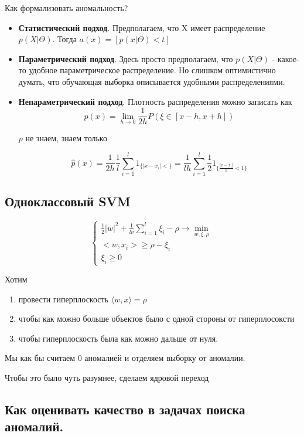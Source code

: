 \documentclass[12pt]{article}
\begin{document}
Как формализовать аномальность?
\begin{itemize}
    \item \textbf{Статистический подход}.
    Предполагаем, что X имеет распределение $p(X|\Theta)$. Тогда $a(x) = [p(x|\Theta) < t]$
    \item \textbf{Параметрический подход}. Здесь просто предполагаем, что $p(X|\Theta)$ - какое-то удобное параметрическое распределение. Но слишком оптимистично думать, что обучающая выборка описывается удобными распределениями.
    \item \textbf{Непараметрический подход}. Плотность распределения можно записать как 
    \[ p(x) = \lim_{h \rightarrow 0} \frac{1}{2h} P(\xi \in [x-h, x+h]) \]

    $p$ не знаем, знаем только 

    \[\hat{p}(x) = \frac{1}{2h} \frac{1}{l} \sum_{i=1}^l 1_{\{|x-x_i| < \}} = \frac{1}{lh} \sum_{i=1}^l \frac{1}{2} 1_{\{\frac{|x-x_i|}{h} < 1\}} \]
\end{itemize}

\subsection*{Одноклассовый SVM}

\[ \begin{cases}
    \frac{1}{2} |w|^2 + \frac{1}{l\nu} \sum_{i=1}^l \xi_i - \rho \rightarrow \min_{w, \xi, \rho} \\
    <w, x_i> \geq \rho - \xi_i \\
    \xi_i \geq 0
\end{cases}
    \]

    Хотим \begin{enumerate}
        \item провести гиперплоскость $\langle w, x \rangle = \rho$
        \item чтобы как можно больше объектов было с одной стороны от гиперплосоксти
        \item чтобы гиперплоскость была как можно дальше от нуля.
    \end{enumerate}

    Мы как бы считаем 0 аномалией и отделяем выборку от аномалии.

    Чтобы это было чуть разумнее, сделаем ядровой переход

    \subsection*{Как оценивать качество в задачах поиска аномалий.}
\end{document}
